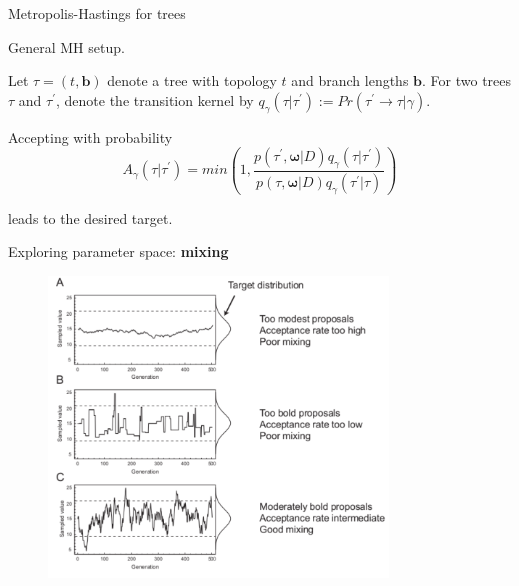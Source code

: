 \documentclass[newPxFont,numfooter,sectionpages]{beamer}
\begin{document}
\begin{frame}{Metropolis-Hastings for trees}

General MH setup.

Let $\tau = (t, \boldsymbol b)$ denote a tree with topology $t$ and branch lengths $\boldsymbol b$. 
For two trees $\tau$ and $\tau^\prime$, denote  the transition kernel by $q_{\gamma}(\tau| \tau^\prime) := Pr(\tau^\prime \rightarrow \tau | \gamma)$.

Accepting with probability
\[ A_{\gamma}(\tau | \tau^\prime) = min\left(1, \frac{ p(\tau^\prime, \boldsymbol \omega | D)q_{\gamma}(\tau|\tau^\prime)}{p(\tau, \boldsymbol \omega | D)q_{\gamma}(\tau^\prime|\tau)}\right) \]

leads to the desired target.

\end{frame}

\begin{frame}{Exploring parameter space: \textbf{mixing}}
\begin{figure}
	\includegraphics[width=\textwidth,height=8cm]{figures/mixing.pdf} 
\end{figure}
\end{frame}
\end{document}
